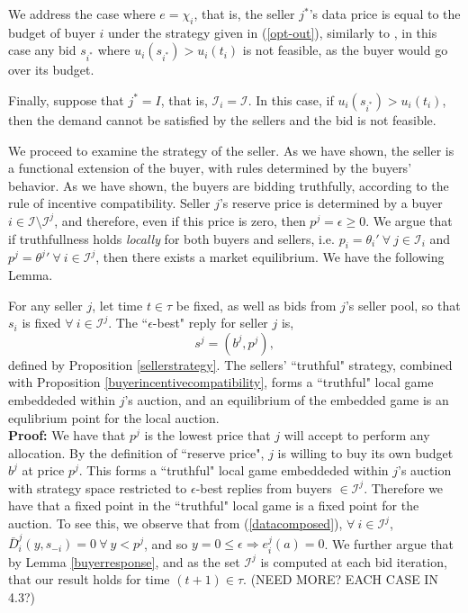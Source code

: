 \documentclass[12pt]{article}
\theoremstyle{definition}
\newcommand{\mcI}{\mathcal{I}}
\begin{document}
\begin{multicols}{2}
We address the case where $e=\chi_i$, that is, the seller $j^*$'s data price is
equal to the budget of buyer $i$ under the strategy given in
(\ref{opt-out}), similarly to \cite{semret}, in this case any bid $s_{i^*}$
where $u_i(s_{i^*}) > u_i(t_i)$ is not feasible, as the buyer would go over its
budget.

Finally, suppose that $j^* = I$, that is, $\mcI_i = \mcI$. 
In this case, if $u_i(s_{i^*}) > u_i(t_i)$, then
the demand cannot be satisfied by the sellers and the bid is not feasible. 

We proceed to examine the strategy of the seller. As we have shown, the seller
is a functional extension of the buyer, with rules determined by the buyers'
behavior. As we have shown, the buyers are bidding truthfully, according to the
rule of incentive compatibility. Seller $j$'s reserve price is determined by a
buyer $i \in \mcI \setminus \mcI^j$, and therefore, even if this price is zero,
then $p^j = \epsilon \ge 0$.
We argue that if truthfullness holds \emph{locally} for both buyers and sellers, i.e. $p_i ={\theta_i}' \
\forall \ j \in \mcI_i$ and $p^j = {\theta^j}' \ \forall \ i \in\mcI^j$, then there exists a market
equilibrium. We have the following Lemma.

{
For any seller $j$, let time $t \in \tau$ be fixed, as well as bids from $j$'s
seller pool, so that $s_i$ is fixed $\forall \ i \in\mcI^j$. The
``$\epsilon$-best" reply for seller $j$ is,
$$
    s^j = (b^j, p^j),
$$
defined by Proposition \ref{sellerstrategy}.
The sellers' ``truthful" strategy, combined with Proposition
\ref{buyerincentivecompatibility}, forms a
``truthful" local game embeddeded within $j$'s auction, and an equilibrium of
the embedded game is an equlibrium point for the local auction. 
}\\
\textbf{Proof:}
We have that $p^j$ is the lowest price that $j$
will accept to perform any allocation. By the definition of ``reserve
price", $j$ is willing to buy its own budget $b^j$ at price $p^j$. This forms a
``truthful" local game embeddeded within $j$'s auction with strategy space
restricted to $\epsilon$-best replies from buyers $\in \mcI^j$. Therefore we have that a
fixed point in the ``truthful" local game is a fixed point for the auction.
To see this, we observe that from (\ref{datacomposed}), $\forall \ i \in \mcI^j$, $\bar{D}_i^j(y, s_{-i}) =
0 \ \forall \ y < p^j$, and so $y=0 \le \epsilon \Rightarrow e_i^j(a) = 0$. We
further argue that by Lemma \ref{buyerresponse}, and as the set $\mcI^j$ is
computed at each bid iteration, that our result holds for time $(t+1) \in \tau$.
(NEED MORE? EACH CASE IN 4.3?)


\end{multicols}
\end{document}

